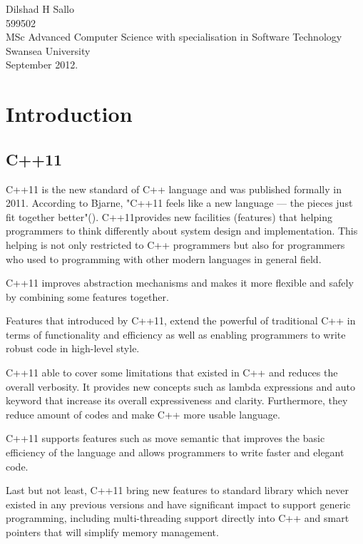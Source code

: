 \documentclass[11pt]{report}
\begin{document}
\begin{flushright}
Dilshad H Sallo\\
599502\\
MSc Advanced Computer Science with specialisation in Software Technology\\
Swansea University\\
September 2012.
\end{flushright}

\tableofcontents
{}
\listoffigures


\chapter{Introduction}
\label{cha:intro}


\section{C++11}
\label{sec: C++11}
C++11 is the new standard of C++ language and was published formally in 2011.  According to Bjarne, "C++11 feels like a new language — the pieces just fit together better"(\cite{Stroustrup:2012:Cpp11}). C++11provides new facilities (features) that helping programmers to think differently about system design and implementation. This helping is not only restricted to C++ programmers but also for programmers who used to programming with other modern languages in general field. 

C++11 improves abstraction mechanisms and makes it more flexible and safely by combining some features together.

Features that introduced by C++11, extend the powerful of traditional C++ in terms of functionality and efficiency as well as enabling programmers to write robust code in high-level style.

C++11 able to cover some limitations that existed in C++ and reduces the overall verbosity. It provides new concepts such as lambda expressions and auto keyword that increase its overall expressiveness and clarity. Furthermore, they reduce amount of codes and make C++ more usable language.

C++11 supports features such as move semantic that improves the basic efficiency of the language and allows programmers to write faster and elegant code. 

Last but not least, C++11 bring new features to standard library which never existed in any previous versions and have significant impact to support generic programming, including multi-threading support directly into C++ and smart pointers that will simplify memory management.
\end{document}
